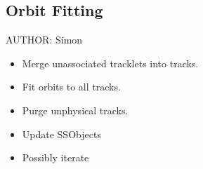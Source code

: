 \subsection{Orbit Fitting}
\label{sec:acOrbitFitting}
AUTHOR: Simon
\begin{itemize}
\item Merge unassociated tracklets into tracks.
\item Fit orbits to all tracks.
\item Purge unphysical tracks.
\item Update SSObjects
\item Possibly iterate
\end{itemize}
